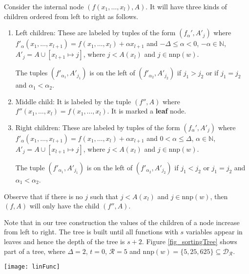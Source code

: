 \documentclass[envcountsame]{llncs}
\newcommand{\Nat}{\mathbb{N}}
\newcommand{\nnp}{\mathrm{nnp}}
\begin{document}
Consider the internal node $(f(x_1,\dots,x_l),A)$. It will have three kinds of children ordered from left to right as follows.
\begin{enumerate}
 \item Left children: These are labeled by tuples of the form $(f_{\alpha}',A'_j)$ 
where\linebreak $f'_{\alpha}(x_1,\dots,x_{l+1})=f(x_1,\dots,x_l)+\alpha x_{l+1}$ and $-\Delta \leq \alpha < 0$, $-\alpha \in \Nat$, $A'_j=A\cup[x_{l+1}\mapsto j]$, where $j < A(x_l)$ and $j \in\nnp(w)$.

 The tuples $(f'_{\alpha_1},A'_{j_1})$ is on the left of $(f'_{\alpha_2},A'_{j _2})$ if $j_1>j_2$ or if $j_1=j_2$ and $\alpha_1<\alpha_2$. 
 \item Middle child: It is labeled by the tuple $(f'',A)$ where $f''(x_1,\dots,x_{l})=f(x_1,\dots,x_l)$. It is marked a {\bf leaf} node.
  \item Right children: These are labeled by tuples of the form $(f_{\alpha}',A'_j)$ 
where $f'_{\alpha}(x_1,\dots,x_{l+1})=f(x_1,\dots,x_l)+\alpha x_{l+1}$ and $0< \alpha \leq \Delta$, $\alpha \in \Nat$, $A'_j=A\cup[x_{l+1}\mapsto j]$, where $j < A(x_l)$ and $j \in\nnp(w)$.

The tuple $(f'_{\alpha_1},A'_{j_1})$ is on the left of $(f'_{\alpha_2},A'_{j_ 2})$ if $j_1<j_2$ or $j_1=j_2$ and $\alpha_1<\alpha_2$. 
\end{enumerate}

Observe that if there is no $j$ such that $j < A(x_l)$ and $j \in\nnp(w)$, then $(f,A)$ will only have the child $(f'',A)$.


Note that in our tree construction the values of the children of a node increase from left to right. The tree is built until
all functions with $s$ variables appear in leaves and hence the depth of the tree is $s+2$.
Figure \ref{fig_sortingTree} shows part of a tree, where $\Delta=2$, $t=0$, $\mathcal{R}=5$ and $\nnp(w) = \{5,25,625\} \subseteq
\mathcal{D}_{\mathcal{R}}$.

\begin{figure*}
\centering
\vspace*{-4mm}
\texttt{[image: linFunc]} 
\vspace*{-4mm}
\caption{Sorting Tree: The double circles represent leaves of the tree. The nodes of the tree are labelled $(f,A)$, 
where $A$ is an assignment for the function $f$ and $t=0$. For better presentation we only show the assignment to the newly introduced variable in a node. 
For example, the tuple $(x-2y,25)$ assigns $x = 625$ and $y=25$. The assignment to $x$ is given in the node's parent.}
\label{fig_sortingTree}
\vspace*{-5mm}
\end{figure*} 
\end{document}
